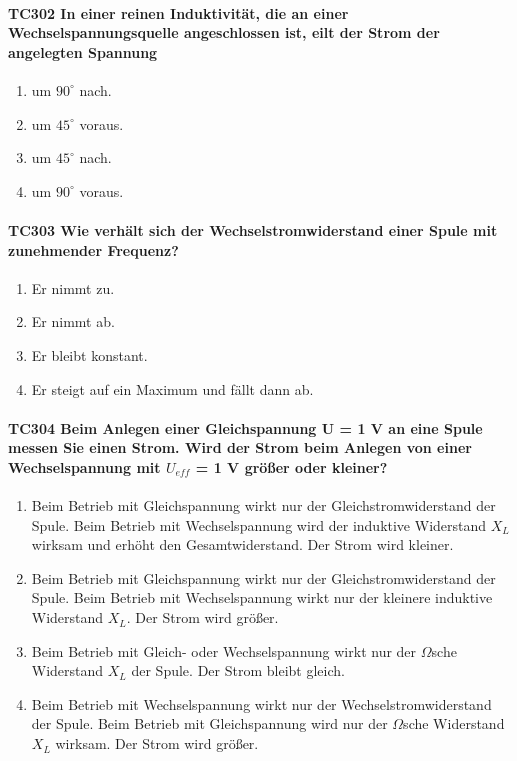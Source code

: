 \documentclass[8pt]{article}
\begin{document}
\begin{enumerate}
\begin{enumerate}[nolistsep,label=\Alph*]
{\paragraph*{TC302 In einer reinen Induktivität, die an einer Wechselspannungsquelle angeschlossen ist, eilt der Strom der angelegten Spannung}
\begin{enumerate}[nolistsep,label=\Alph*]
\item um $90^{\circ}$ nach.
\item um $45^{\circ}$ voraus.
\item um $45^{\circ}$ nach.
\item um $90^{\circ}$ voraus.
\end{enumerate}

\paragraph*{TC303 Wie verhält sich der Wechselstromwiderstand einer Spule mit zunehmender Frequenz?}
\begin{enumerate}[nolistsep,label=\Alph*]
\item Er nimmt zu.
\item Er nimmt ab.
\item Er bleibt konstant.
\item Er steigt auf ein Maximum und fällt dann ab.
\end{enumerate}

\paragraph*{TC304 Beim Anlegen einer Gleichspannung U = 1 V an eine Spule messen Sie einen Strom. Wird der Strom beim Anlegen von einer Wechselspannung mit $U_{eff}$ = 1 V größer oder kleiner?}
\begin{enumerate}[nolistsep,label=\Alph*]
\item Beim Betrieb mit Gleichspannung wirkt nur der Gleichstromwiderstand der Spule. Beim Betrieb mit Wechselspannung wird der induktive Widerstand $X_{L}$ wirksam und erhöht den Gesamtwiderstand. Der Strom wird kleiner.
\item Beim Betrieb mit Gleichspannung wirkt nur der Gleichstromwiderstand der Spule. Beim Betrieb mit Wechselspannung wirkt nur der kleinere induktive Widerstand $X_{L}$. Der Strom wird größer. 
\item Beim Betrieb mit Gleich- oder Wechselspannung wirkt nur der $\Omega$sche Widerstand $X_{L}$ der Spule. Der Strom bleibt gleich.
\item Beim Betrieb mit Wechselspannung wirkt nur der Wechselstromwiderstand der Spule. Beim Betrieb mit Gleichspannung wird nur der $\Omega$sche Widerstand $X_{L}$ wirksam. Der Strom wird größer.
\end{enumerate}

}
\end{enumerate}
\end{enumerate}
\end{document}
